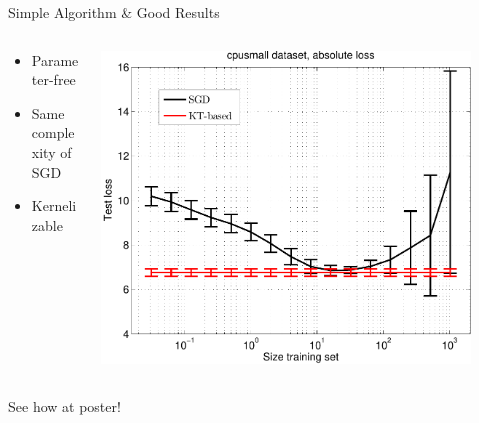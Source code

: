 \documentclass{beamer}
\begin{document}
\begin{frame}{Simple Algorithm \& Good Results}

\begin{columns}[c]
  \begin{column}{6cm}
   \small 
   \begin{itemize}
    \item Parameter-free
    \item Same complexity of SGD
    \item Kernelizable
    \end{itemize}
  \end{column}
  \begin{column}{5cm}
    \includegraphics[width=0.9\textwidth]{../figs/cpusmall_kt_train_test-crop}
  \end{column}
\end{columns}

\vspace{.25cm}


\begin{center}
See how at poster!
\end{center}

\end{frame}
\end{document}
